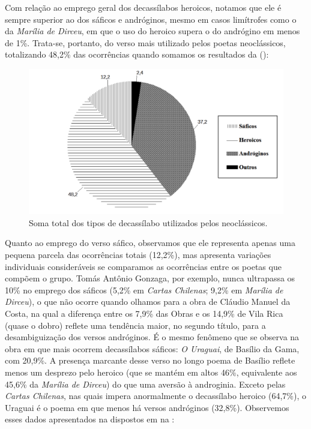 \documentclass[portuguese]{textolivre}
\begin{document}
Com relação ao emprego geral dos decassílabos heroicos, notamos que ele é sempre superior ao dos sáficos e andróginos, mesmo em casos limítrofes como o da \textit{Marília de Dirceu}, em que o uso do heroico supera o do andrógino em menos de  1\%. Trata-se, portanto, do verso mais utilizado pelos poetas neoclássicos, totalizando 48,2\% das ocorrências quando somamos os resultados da  ():

\begin{figure}
    \centering
    \begin{minipage}{0.75\linewidth}
    \includegraphics[width=\linewidth]{fig-001.pdf}
    \caption{Soma total dos tipos de decassílabo utilizados pelos neoclássicos.}
    \label{fig1}
    \end{minipage}
\end{figure}

Quanto ao emprego do verso sáfico, observamos que ele representa apenas uma pequena parcela das ocorrências totais (12,2\%), mas apresenta variações individuais consideráveis se comparamos as ocorrências entre os poetas que compõem o grupo. Tomás Antônio Gonzaga, por exemplo, nunca ultrapassa os 10\% no emprego dos sáficos (5,2\% em \textit{Cartas Chilenas}; 9,2\% em \textit{Marília de Dirceu}), o que não ocorre quando olhamos para a obra de Cláudio Manuel da Costa, na qual a diferença entre os 7,9\% das Obras e os 14,9\% de Vila Rica (quase o dobro) reflete uma tendência maior, no segundo título, para a desambiguização dos versos andróginos. É o mesmo fenômeno que se observa na obra em que mais ocorrem decassílabos sáficos: \textit{O Uraguai}, de Basílio da Gama, com 20,9\%. A presença marcante desse verso no longo poema de Basílio reflete menos um desprezo pelo heroico (que se mantém em altos 46\%, equivalente aos 45,6\% da \textit{Marília de Dirceu}) do que uma aversão à androginia. Exceto pelas \textit{Cartas Chilenas}, nas quais impera anormalmente o decassílabo heroico (64,7\%), o Uraguai é o poema em que menos há versos andróginos (32,8\%). Observemos esses dados apresentados na  dispostos em na :
\end{document}
